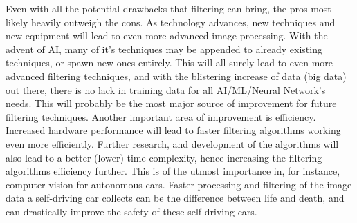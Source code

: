 \documentclass[twoside,a4paper,article]{combine}
\begin{document}
Even with all the potential drawbacks that filtering can bring, the pros most likely heavily outweigh the cons. As technology advances, new techniques and new equipment will lead to even more advanced image processing. With the advent of AI, many of it's techniques may be appended to already existing techniques, or spawn new ones entirely. This will all surely lead to even more advanced filtering techniques, and with the blistering increase of data (big data) out there, there is no lack in training data for all AI/ML/Neural Network's needs. This will probably be the most major source of improvement for future filtering techniques. Another important area of improvement is efficiency. Increased hardware performance will lead to faster filtering algorithms working even more efficiently. Further research, and development of the algorithms will also lead to a better (lower) time-complexity, hence increasing the filtering algorithms efficiency further. This is of the utmost importance in, for instance, computer vision for autonomous cars. Faster processing and filtering of the image data a self-driving car collects can be the difference between life and death, and can drastically improve the safety of these self-driving cars.\footnotemark{}



\end{document}
